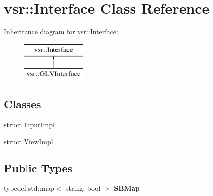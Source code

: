 \hypertarget{classvsr_1_1_interface}{\section{vsr\-:\-:Interface Class Reference}
\label{classvsr_1_1_interface}
}
Inheritance diagram for vsr\-:\-:Interface\-:\begin{figure}[H]
\begin{center}
\leavevmode
\includegraphics[height=2.000000cm]{classvsr_1_1_interface}
\end{center}
\end{figure}
\subsection*{Classes}
\begin{DoxyCompactItemize}
\item 
struct \hyperlink{structvsr_1_1_interface_1_1_input_impl}{Input\-Impl}
\item 
struct \hyperlink{structvsr_1_1_interface_1_1_view_impl}{View\-Impl}
\end{DoxyCompactItemize}
\subsection*{Public Types}
\begin{DoxyCompactItemize}
\item 
\hypertarget{classvsr_1_1_interface_ab12bcc17ee54d982c67f30163bbca291}{typedef std\-::map$<$ string, bool $>$ {\bfseries S\-B\-Map}}\label{classvsr_1_1_interface_ab12bcc17ee54d982c67f30163bbca291}

\end{DoxyCompactItemize}
